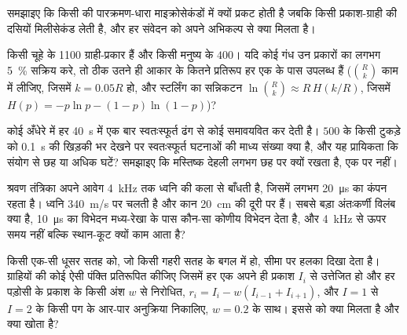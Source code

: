 \begin{exercise}[$\star\star$]\label{exo:b3:sensory-systems:8}
समझाइए कि किसी  की पारक्रमण-धारा माइक्रोसेकंडों में क्यों
प्रकट होती है जबकि किसी प्रकाश-ग्राही की दसियों मिलीसेकंड लेती है, और
हर संवेदन को अपने अभिकल्प से क्या मिलता है।
\end{exercise}

\begin{exercise}[$\star\star$]\label{exo:b3:sensory-systems:9}
किसी चूहे के \num{1100} ग्राही-प्रकार हैं और किसी मनुष्य के $400$। यदि
कोई गंध उन प्रकारों का लगभग \qty{5}{\%} सक्रिय करे, तो ठीक उतने ही
आकार के कितने प्रतिरूप हर एक के पास उपलब्ध हैं ($\binom{R}{k}$ काम में
लीजिए, जिसमें $k = 0.05R$ हो, और स्टर्लिंग का सन्निकटन
$\ln\binom{R}{k} \approx R\,H(k/R)$, जिसमें
$H(p) = -p\ln p - (1-p)\ln(1-p)$)?
\end{exercise}

\begin{exercise}[$\star\star\star$]\label{exo:b3:sensory-systems:10}
कोई  अँधेरे में हर \qty{40}{s} में एक बार स्वतःस्फूर्त ढंग से
कोई  समावयवित कर देती है। $500$  के किसी टुकड़े को
\qty{0.1}{s} की खिड़की भर देखने पर स्वतःस्फूर्त घटनाओं की माध्य संख्या
क्या है, और यह प्रायिकता कि संयोग से छह या अधिक घटें? समझाइए कि
मस्तिष्क देहली लगभग छह पर क्यों रखता है, एक पर नहीं।
\end{exercise}

\begin{exercise}[$\star\star\star$]\label{exo:b3:sensory-systems:11}
श्रवण तंत्रिका अपने आवेग \qty{4}{kHz} तक ध्वनि की कला से बाँधती है,
जिसमें लगभग \qty{20}{\micro s} का कंपन रहता है। ध्वनि \qty{340}{m/s}
पर चलती है और कान \qty{20}{cm} की दूरी पर हैं। सबसे बड़ा अंतःकर्णी
विलंब क्या है, \qty{10}{\micro s} का विभेदन मध्य-रेखा के पास कौन-सा
कोणीय विभेदन देता है, और \qty{4}{kHz} से ऊपर समय नहीं बल्कि स्थान-कूट
क्यों काम आता है?
\end{exercise}

\begin{exercise}[$\star\star\star$]\label{exo:b3:sensory-systems:12}
 किसी एक-सी धूसर सतह को, जो किसी गहरी सतह के बगल में हो,
सीमा पर हलका दिखा देता है। ग्राहियों की कोई ऐसी पंक्ति प्रतिरूपित
कीजिए जिसमें हर एक अपने ही प्रकाश $I_{i}$ से उत्तेजित हो और हर पड़ोसी
के प्रकाश के किसी अंश $w$ से निरोधित,
$r_{i} = I_{i} - w(I_{i-1} + I_{i+1})$, और $I = 1$ से $I = 2$ के किसी
पग के आर-पार अनुक्रिया निकालिए, $w = 0.2$ के साथ। इससे  को क्या
मिलता है और क्या खोता है?
\end{exercise}

